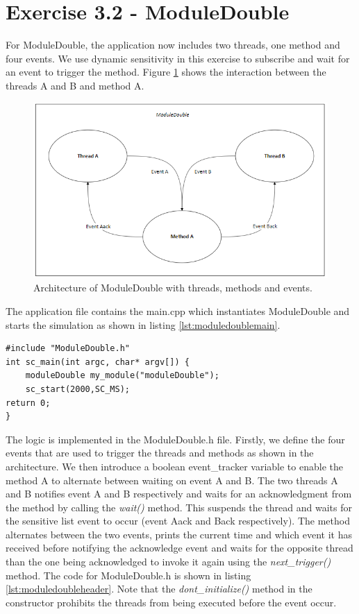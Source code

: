 \section{Exercise 3.2 - ModuleDouble}

For ModuleDouble, the application now includes two threads, one method and four events. We use dynamic sensitivity in this exercise to subscribe and wait for an event to trigger the method. Figure \ref{fig:moduledouble} shows the interaction between the threads A and B and method A.

\begin{figure}[h]
	\centering
	\includegraphics[width=1\linewidth]{ModuleDouble.png}
	\caption{Architecture of ModuleDouble with threads, methods and events.}
	\label{fig:moduledouble}
\end{figure}

The application file contains the main.cpp which instantiates ModuleDouble and starts the simulation as shown in listing \ref{lst:moduledoublemain}.

\begin{lstlisting}[style=customc++, caption=Application file for ModuleDouble,
label={lst:moduledoublemain}]
#include "ModuleDouble.h"
int sc_main(int argc, char* argv[]) {
	moduleDouble my_module("moduleDouble");
	sc_start(2000,SC_MS);
return 0;
}
\end{lstlisting}

The logic is implemented in the ModuleDouble.h file. Firstly, we define the four events that are used to trigger the threads and methods as shown in the architecture. We then introduce a boolean event\_tracker variable to enable the method A to alternate between waiting on event A and B. The two threads A and B notifies event A and B respectively and waits for an acknowledgment from the method by calling the \textit{wait()} method. This suspends the thread and waits for the sensitive list event to occur (event Aack and Back respectively). The method alternates between the two events, prints the current time and which event it has received before notifying the acknowledge event and waits for the opposite thread than the one being acknowledged to invoke it again using the \textit{next\_trigger()} method. The code for ModuleDouble.h is shown in listing \ref{lst:moduledoubleheader}. Note that the \textit{dont\_initialize()} method in the constructor prohibits the threads from being executed before the event occur.

